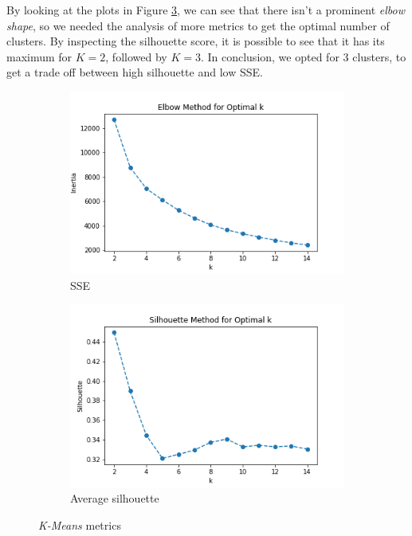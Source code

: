 By looking at the plots in Figure \ref{fig:km_metrics}, we can see that there isn't a prominent \emph{elbow shape}, so we needed the analysis of more metrics to get the optimal number of clusters. By inspecting the silhouette score, it is possible to see that it has its maximum for $K = 2$, followed by $K = 3$. In conclusion, we opted for 3 clusters, to get a trade off between high silhouette and low SSE.

\begin{figure}[h!]
     \captionsetup{justification=centering}		
     \centering
     \begin{subfigure}{0.49\textwidth}
         \centering
	 \captionsetup{type=figure}
         \includegraphics[width=\textwidth]{img/clustering/sse.png}
         \caption{SSE}
         \label{fig:sse}
     \end{subfigure}
     \begin{subfigure}{0.49\textwidth}
         \centering
         \includegraphics[width=\textwidth]{img/clustering/sil.png}
         \caption{Average silhouette}
         \label{fig:sil}
     \end{subfigure}
     \caption{\emph{K-Means} metrics}
    \label{fig:km_metrics}
\end{figure}

